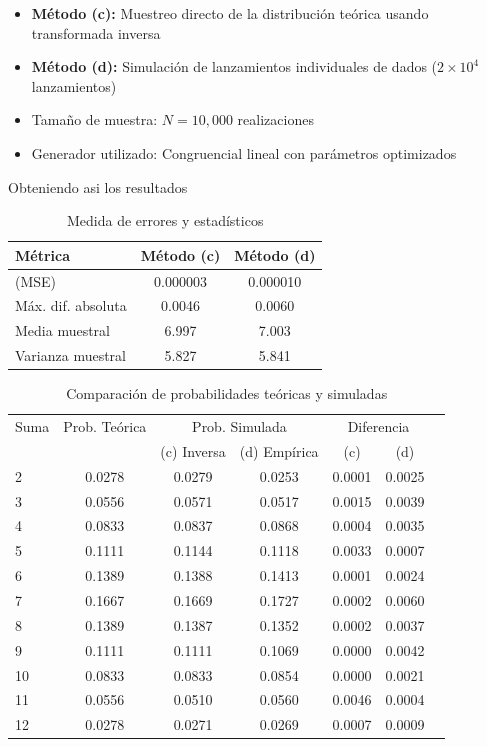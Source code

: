 \documentclass[baaa]{baaa}
\begin{document}
\begin{itemize}
    \item \textbf{Método (c):} Muestreo directo de la distribución teórica usando transformada inversa
    \item \textbf{Método (d):} Simulación de lanzamientos individuales de dados (\(2 \times 10^4\) lanzamientos)
    \item Tamaño de muestra: \(N = 10,000\) realizaciones
    \item Generador utilizado: Congruencial lineal con parámetros optimizados
\end{itemize}

Obteniendo asi los resultados 

\begin{table}[!h]
    \centering
    \small
    \begin{tabular}{lcc}
        \toprule
        Métrica & Método (c) & Método (d) \\
        \midrule
         (MSE) & 0.000003 & 0.000010 \\
        Máx. dif. absoluta & 0.0046 & 0.0060 \\
        Media muestral & 6.997 & 7.003 \\
        Varianza muestral & 5.827 & 5.841 \\
        \bottomrule
    \end{tabular}
    \caption{Medida de errores y estadísticos}
    \label{dados_stat}
\end{table}


\begin{table}[!h]
    \centering
    \footnotesize
    \begin{tabular}{lcccccc}
        \toprule
        Suma & Prob. Teórica & \multicolumn{2}{c}{Prob. Simulada} & \multicolumn{2}{c}{Diferencia} \\
        \cmidrule(lr){3-4} \cmidrule(lr){5-6}
        & & (c) Inversa & (d) Empírica & (c) & (d) \\
        \midrule
        2 & 0.0278 & 0.0279 & 0.0253 & 0.0001 & 0.0025 \\
        3 & 0.0556 & 0.0571 & 0.0517 & 0.0015 & 0.0039 \\
        4 & 0.0833 & 0.0837 & 0.0868 & 0.0004 & 0.0035 \\
        5 & 0.1111 & 0.1144 & 0.1118 & 0.0033 & 0.0007 \\
        6 & 0.1389 & 0.1388 & 0.1413 & 0.0001 & 0.0024 \\
        7 & 0.1667 & 0.1669 & 0.1727 & 0.0002 & 0.0060 \\
        8 & 0.1389 & 0.1387 & 0.1352 & 0.0002 & 0.0037 \\
        9 & 0.1111 & 0.1111 & 0.1069 & 0.0000 & 0.0042 \\
        10 & 0.0833 & 0.0833 & 0.0854 & 0.0000 & 0.0021 \\
        11 & 0.0556 & 0.0510 & 0.0560 & 0.0046 & 0.0004 \\
        12 & 0.0278 & 0.0271 & 0.0269 & 0.0007 & 0.0009 \\
        \bottomrule
    \end{tabular}
    \caption{Comparación de probabilidades teóricas y simuladas}
    \label{dados_resul}
\end{table}
\end{document}
